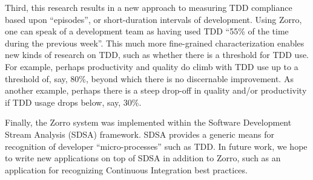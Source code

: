 \documentclass[smallextended]{svjour3}     %
\begin{document}
Third, this research results in a new approach to measuring TDD compliance
based upon ``episodes'', or short-duration intervals of development.  Using
Zorro, one can speak of a development team as having used TDD ``55\% of the
time during the previous week''.  This much more fine-grained
characterization enables new kinds of research on TDD, such as whether
there is a threshold for TDD use.  For example, perhaps productivity and
quality do climb with TDD use up to a threshold of, say, 80\%, beyond which
there is no discernable improvement.  As another example, perhaps there is
a steep drop-off in quality and/or productivity if TDD usage drops below,
say, 30\%.

Finally, the Zorro system was implemented within the Software Development
Stream Analysis (SDSA) framework.  SDSA provides a generic means for
recognition of developer ``micro-processes'' such as TDD.  In future work,
we hope to write new applications on top of SDSA in addition to Zorro, such
as an application for recognizing Continuous Integration best practices.



\end{document}
